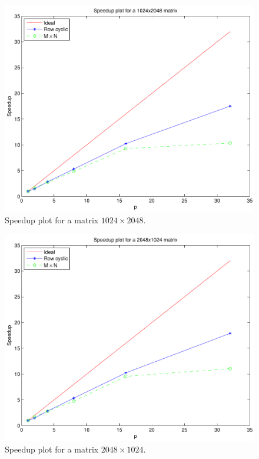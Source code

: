 \documentclass[a4paper,11pt]{article}
\begin{document}
\begin{figure}[H]
\begin{center}
 \includegraphics[scale=0.6]{img/1024x2048.pdf}
\caption{Speedup plot for a matrix $1024 \times 2048$.}
\end{center}
\end{figure}

\begin{figure}[H]
\begin{center}
 \includegraphics[scale=0.6]{img/2048x1024.pdf}
\caption{Speedup plot for a matrix $2048 \times 1024$.}
\end{center}
\end{figure}
\end{document}
